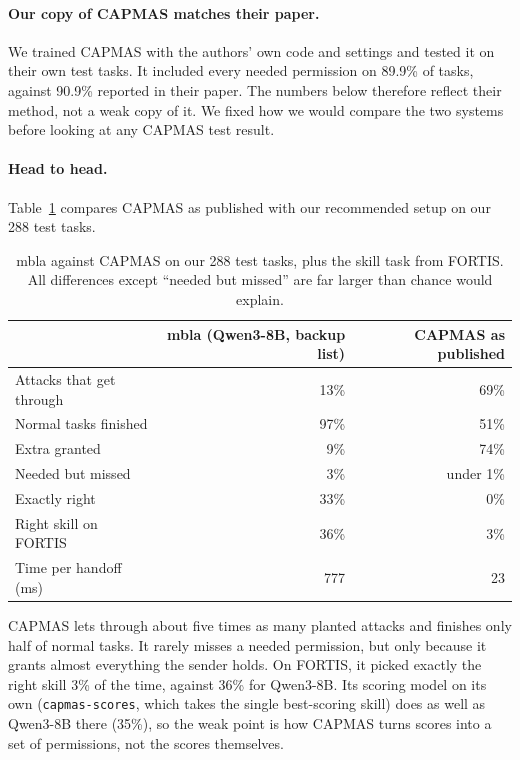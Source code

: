 \documentclass[11pt]{article}
\begin{document}
\paragraph{Our copy of CAPMAS matches their paper.}
We trained CAPMAS with the authors' own code and settings and tested it on their own test tasks. It included
every needed permission on 89.9\% of tasks, against 90.9\% reported in their paper. The numbers below
therefore reflect their method, not a weak copy of it. We fixed how we would compare the two systems before
looking at any CAPMAS test result.

\paragraph{Head to head.}
Table~\ref{tab:capmas} compares CAPMAS as published with our recommended setup on our 288 test tasks.
\begin{table}[H]\centering\small
\begin{tabular}{lrr}
\toprule
 & mbla (Qwen3-8B, backup list) & CAPMAS as published \\
\midrule
Attacks that get through & 13\% & 69\% \\
Normal tasks finished & 97\% & 51\% \\
Extra granted & 9\% & 74\% \\
Needed but missed & 3\% & under 1\% \\
Exactly right & 33\% & 0\% \\
Right skill on FORTIS & 36\% & 3\% \\
Time per handoff (ms) & 777 & 23 \\
\bottomrule
\end{tabular}
\caption{mbla against CAPMAS on our 288 test tasks, plus the skill task from FORTIS. All differences
except ``needed but missed'' are far larger than chance would explain.}\label{tab:capmas}\end{table}
CAPMAS lets through about five times as many planted attacks and finishes only half of normal tasks. It
rarely misses a needed permission, but only because it grants almost everything the sender holds. On FORTIS,
it picked exactly the right skill 3\% of the time, against 36\% for Qwen3-8B. Its scoring model on its own
(\texttt{capmas-scores}, which takes the single best-scoring skill) does as well as Qwen3-8B there (35\%), so
the weak point is how CAPMAS turns scores into a set of permissions, not the scores themselves.
\end{document}
